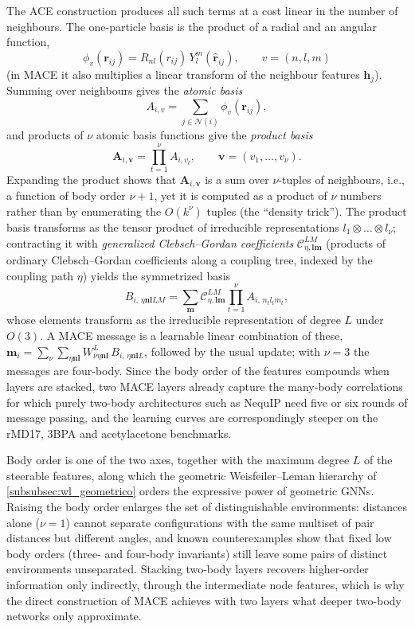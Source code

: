 The ACE construction produces all such terms at a cost linear in the number of neighbours. The one-particle basis is the product of a radial and an angular function,
\[\phi_v(\mathbf{r}_{ij}) = R_{nl}(r_{ij})\, Y_l^m(\hat{\mathbf{r}}_{ij}), \qquad v = (n, l, m)\]
(in MACE it also multiplies a linear transform of the neighbour features $\mathbf{h}_j$). Summing over neighbours gives the \emph{atomic basis}
\[A_{i,v} = \sum_{j \in \mathcal{N}(i)} \phi_v(\mathbf{r}_{ij}),\]
and products of $\nu$ atomic basis functions give the \emph{product basis}
\[\mathbf{A}_{i,\mathbf{v}} = \prod_{t=1}^{\nu} A_{i,v_t}, \qquad \mathbf{v} = (v_1, \dots, v_\nu).\]
Expanding the product shows that $\mathbf{A}_{i,\mathbf{v}}$ is a sum over $\nu$-tuples of neighbours, i.e., a function of body order $\nu + 1$, yet it is computed as a product of $\nu$ numbers rather than by enumerating the $O(k^\nu)$ tuples (the ``density trick''). The product basis transforms as the tensor product of irreducible representations $l_1 \otimes \dots \otimes l_\nu$; contracting it with \emph{generalized Clebsch--Gordan coefficients} $\mathcal{C}^{LM}_{\eta, \mathbf{l}\mathbf{m}}$ (products of ordinary Clebsch--Gordan coefficients along a coupling tree, indexed by the coupling path $\eta$) yields the symmetrized basis
\[B_{i,\, \eta \mathbf{n} \mathbf{l} L M} = \sum_{\mathbf{m}} \mathcal{C}^{LM}_{\eta, \mathbf{l}\mathbf{m}} \prod_{t=1}^{\nu} A_{i,\, n_t l_t m_t},\]
whose elements transform as the irreducible representation of degree $L$ under $O(3)$. A MACE message is a learnable linear combination of these, $\mathbf{m}_i = \sum_{\nu} \sum_{\eta \mathbf{n} \mathbf{l}} W^{L}_{\nu \eta \mathbf{n} \mathbf{l}}\, B_{i,\, \eta \mathbf{n} \mathbf{l} L}$, followed by the usual update; with $\nu = 3$ the messages are four-body. Since the body order of the features compounds when layers are stacked, two MACE layers already capture the many-body correlations for which purely two-body architectures such as NequIP need five or six rounds of message passing, and the learning curves are correspondingly steeper on the rMD17, 3BPA and acetylacetone benchmarks.

\begin{remark}\label{rem:orden_cuerpo_expresividad}
Body order is one of the two axes, together with the maximum degree $L$ of the steerable features, along which the geometric Weisfeiler--Leman hierarchy of \autoref{subsubsec:wl_geometrico} orders the expressive power of geometric \glspl{GNN}. Raising the body order enlarges the set of distinguishable environments: distances alone ($\nu = 1$) cannot separate configurations with the same multiset of pair distances but different angles, and known counterexamples show that fixed low body orders (three- and four-body invariants) still leave some pairs of distinct environments unseparated. Stacking two-body layers recovers higher-order information only indirectly, through the intermediate node features, which is why the direct construction of MACE achieves with two layers what deeper two-body networks only approximate.
\end{remark}

